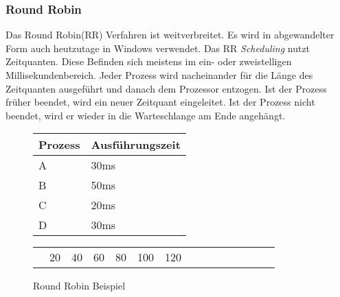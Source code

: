 \subsubsection{Round Robin}
Das Round Robin(RR) Verfahren ist weitverbreitet. Es wird in abgewandelter Form auch heutzutage in Windows verwendet.\cite{Windows:Lohmann} Das RR \textit{Scheduling} nutzt Zeitquanten. Diese Befinden sich meistens im ein- oder zweistelligen Millisekundenbereich. Jeder Prozess wird nacheinander für die Länge des Zeitquanten ausgeführt und danach dem Prozessor entzogen. Ist der Prozess früher beendet, wird ein neuer Zeitquant eingeleitet. Ist der Prozess nicht beendet, wird er wieder in die Warteschlange am Ende angehängt.\cite[Seite 176f.]{BetriebssystemeKompakt}\\
\begin{figure}[h]
    \centering
    \begin{tabular}{| l | l |}
        \hline
        Prozess & Ausführungszeit\\
        \hline
        \cellcolor{red!20}A & 30ms\\
        \hline
        \cellcolor{blue!20}B & 50ms\\
        \hline
        \cellcolor{green!20}C & 20ms\\
        \hline
        \cellcolor{black!20}D & 30ms\\
        \hline
    \end{tabular}
    \begin{tabular}{|c|c|c|c|c|c|c|c|c|c|c|c|c|c|c|c|c|c|c|c|c|}
        \hline
        \cellcolor{red!20} & \cellcolor{red!20} & \cellcolor{blue!20} & \cellcolor{blue!20} & \cellcolor{green!20} & \cellcolor{green!20} & \cellcolor{black!20} & \cellcolor{black!20} & \cellcolor{red!20} & \cellcolor{blue!20} & \cellcolor{blue!20} & \cellcolor{black!20} & \cellcolor{blue!20}\\
        \hline
        \multicolumn{1}{l}{} & \multicolumn{2}{c}{\tiny 20} & \multicolumn{2}{c}{\tiny 40} & \multicolumn{2}{c}{\tiny 60} & \multicolumn{2}{c}{\tiny 80} & \multicolumn{2}{c}{\tiny 100} & \multicolumn{2}{c}{\tiny 120}\\
    \end{tabular}
    \caption{Round Robin Beispiel}
    \label{RoundRobin}
\end{figure}

